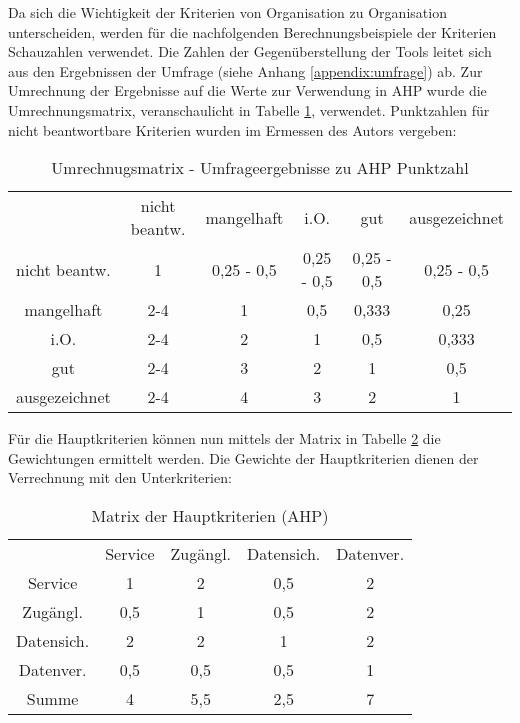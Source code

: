 Da sich die Wichtigkeit der Kriterien von Organisation zu Organisation unterscheiden, werden für die nachfolgenden Berechnungsbeispiele der Kriterien Schauzahlen verwendet. Die Zahlen der Gegenüberstellung der Tools leitet sich aus den Ergebnissen der Umfrage (siehe Anhang \ref{appendix:umfrage}) ab. Zur Umrechnung der Ergebnisse auf die Werte zur Verwendung in AHP wurde die Umrechnungsmatrix, veranschaulicht in Tabelle \ref{tab:umrechMatrix}, verwendet. Punktzahlen für nicht beantwortbare Kriterien wurden im Ermessen des Autors vergeben:

\begin{table}[h]
	\centering
  \begin{tabular}{cccccc}
    & nicht beantw. & mangelhaft & i.O. & gut & ausgezeichnet \\
    nicht beantw. & 1 & 0,25 - 0,5 & 0,25 - 0,5 & 0,25 - 0,5 & 0,25 - 0,5 \\
    mangelhaft & 2-4 & 1 & 0,5 & 0,333 & 0,25 \\
    i.O. & 2-4 & 2 & 1 & 0,5 & 0,333 \\
    gut & 2-4 & 3 & 2 & 1 & 0,5 \\
    ausgezeichnet & 2-4 & 4 & 3 & 2 & 1 \\
    \end{tabular} 
	\caption{Umrechnugsmatrix - Umfrageergebnisse zu AHP Punktzahl}
	\label{tab:umrechMatrix}
\end{table}

Für die Hauptkriterien können nun mittels der Matrix in Tabelle \ref{tab:MatrixHauptkriterien} die Gewichtungen ermittelt werden. Die Gewichte der Hauptkriterien dienen der Verrechnung mit den Unterkriterien: 

\begin{table}[h]
	\centering
\begin{tabular}{ccccc}
  & Service & Zugängl. & Datensich. & Datenver. \\
  Service & 1 & 2 & 0,5 & 2 \\
  Zugängl. & 0,5 & 1 & 0,5 & 2 \\
  Datensich. & 2 & 2 & 1 & 2 \\
  Datenver. & 0,5 & 0,5 & 0,5 & 1 \\
  Summe & 4 & 5,5 & 2,5 & 7 \\
  \end{tabular} 
	\caption{ Matrix der Hauptkriterien (AHP)}
	\label{tab:MatrixHauptkriterien}
\end{table}

